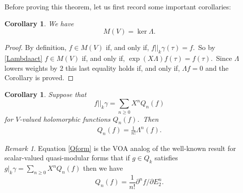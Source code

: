 \documentclass[12pt]{amsart}
\theoremstyle{plain}
\newtheorem{cor}[thm]{Corollary}
\theoremstyle{definition}
\theoremstyle{remark}
\newtheorem{rmk}[thm]{Remark}
\begin{document}
Before proving this theorem, let us first record some important corollaries:
\begin{cor}\label{cokerL} We have
$$M(V)=\ker\Lambda.$$
\end{cor}
\begin{proof}
By definition, $f\in M(V)$ if, and only if, $f||_k\gamma(\tau)=f$.\ So by \eqref{Lambdaact} $f\in M(V)$ if, and only if, $\exp(X\Lambda)f(\tau)=f(\tau)$.\ Since $\Lambda$ lowers weights by $2$ this last equality holds if, and only if, $\Lambda f=0$ and the Corollary is proved.
\end{proof}
\begin{cor}
    Suppose that
    $$f||_k\gamma = \sum_{n\geq 0} X^nQ_n(f)$$
    for $V$-valued holomorphic functions $Q_n(f)$.\ Then
    \begin{eqnarray}\label{Qform}
     Q_n(f)= \frac{1}{n!}\Lambda^n(f).   
    \end{eqnarray}
\end{cor}

\begin{rmk}
 Equation \eqref{Qform} is the VOA analog of the well-known result for scalar-valued quasi-modular forms that if $g\in Q_k$ satisfies
    $g|_k\gamma = \sum_{n\geq0} X^nQ_n(f)$ then we have
    $$Q_n(f)=\frac{1}{n!}\partial^n f/\partial E_2^n.$$
\end{rmk}
\end{document}
